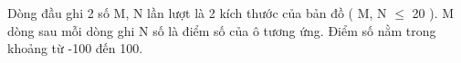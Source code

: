 Dòng đầu ghi 2 số M, N lần lượt là 2 kích thước của bản đồ ( M, N  $\le$  20 ). M dòng sau mỗi dòng ghi N số là điểm số của ô tương ứng. Điểm số nằm trong khoảng từ -100 đến 100.